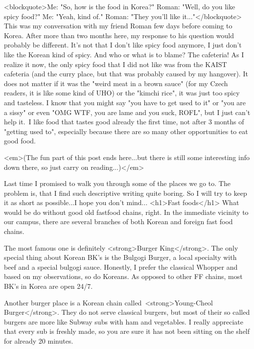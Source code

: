 \begin{post}
	\begin{content}
<blockquote>Me: "So, how is the food in Korea?"
Roman: "Well, do you like spicy food?"
Me: "Yeah, kind of."
Roman: "They you'll like it..."</blockquote>
This was my conversation with my friend Roman few days before coming to Korea. After more than two months here, my response to his question would probably be different. It's not that I don't like spicy food anymore, I just don't like the Korean kind of spicy. And who or what is to blame? The cafeteria! As I realize it now, the only spicy food that I did not like was from the KAIST cafeteria (and the curry place, but that was probably caused by my hangover). It does not matter if it was the "weird meat in a brown sauce" (for my Czech readers, it is like some kind of UHO) or the "kimchi rice", it was just too spicy and tasteless. I know that you might say "you have to get used to it" or "you are a sissy" or even "OMG WTF, you are lame and you suck, ROFL", but I just can't help it. I like food that tastes good already the first time, not after 3 months of "getting used to", especially because there are so many other opportunities to eat good food.

<em>(The fun part of this post ends here...but there is still some interesting info down there, so just carry on reading...)</em>

Last time I promised to walk you through some of the places we go to. The problem is, that I find such descriptive writing quite boring. So I will try to keep it as short as possible...I hope you don't mind...
<h1>Fast foods</h1>
What would be do without good old fastfood chains, right. In the immediate vicinity to our campus, there are several branches of both Korean and foreign fast food chains.

The most famous one is definitely <strong>Burger King</strong>. The only special thing about Korean BK's is the Bulgogi Burger, a local specialty with beef and a special bulgogi sauce. Honestly, I prefer the classical Whopper and based on my observations, so do Koreans. As opposed to other FF chains, most BK's in Korea are open 24/7.

Another burger place is a Korean chain called <strong>Young-Cheol Burger</strong>. They do not serve classical burgers, but most of their so called burgers are more like Subway subs with ham and vegetables. I really appreciate that every sub is freshly made, so you are sure it has not been sitting on the shelf for already 20 minutes.


\end{content}
\end{post}
